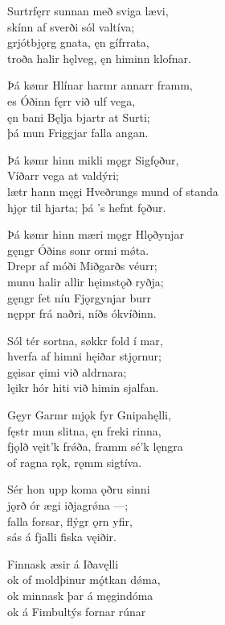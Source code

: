 \bva Surtr\footnotemark[19] fęrr sunnan \hld með sviga lævi, \\
skínn af sverði \hld sól valtíva; \\
grjótbjǫrg gnata, \hld ęn gífr\footnotemark[20] rata, \\
troða halir hęlveg, \hld ęn himinn klofnar.

\bva Þá kømr Hlínar \hld harmr annarr framm, \\
es Óðinn fęrr \hld við ulf vega, \\
ęn bani Bęlja \hld bjartr at Surti; \\
þá mun Friggjar \hld falla angan.

\bva Þá kømr hinn mikli \hld mǫgr Sigfǫður, \\
Víðarr vega \hld at valdýri; \\
lætr hann męgi Hveðrungs \hld mund of standa \\
hjǫr til hjarta; \hld þá ’s hefnt fǫður.

\bva Þá kømr hinn mæri \hld mǫgr Hlǫðynjar \\
gęngr Óðins sonr \hld ormi mǿta. \\
Drepr af móði \hld Miðgarðs véurr; \\
munu halir allir \hld hęimstǫð ryðja; \\
gęngr fet níu \hld Fjǫrgynjar burr \\
nęppr frá naðri, \hld níðs ókvíðinn.

\bva Sól tér sortna, \hld søkkr fold í mar, \\
hverfa af himni \hld hęiðar stjǫrnur; \\
gęisar ęimi \hld við aldrnara; \\
lęikr hór hiti \hld við himin sjalfan.

\bva Gęyr Garmr mjǫk \hld fyr Gnipahęlli, \\
fęstr mun slitna, \hld ęn freki rinna, \\
fjǫlð vęit'k frǿða, \hld framm sé'k lęngra \\
of ragna rǫk, \hld rǫmm sigtíva.

\bva Sér hon upp koma \hld ǫðru sinni \\
jǫrð ór ægi \hld iðjagrǿna —; \\
falla forsar, \hld flýgr ǫrn yfir, \\
sás á fjalli \hld fiska vęiðir.

\bva Finnask æsir \hld á Iðavęlli \\
ok of moldþinur \hld mǫ́tkan dǿma, \\
ok minnask þar \hld á męgindóma \\
ok á Fimbultýs \hld fornar rúnar

